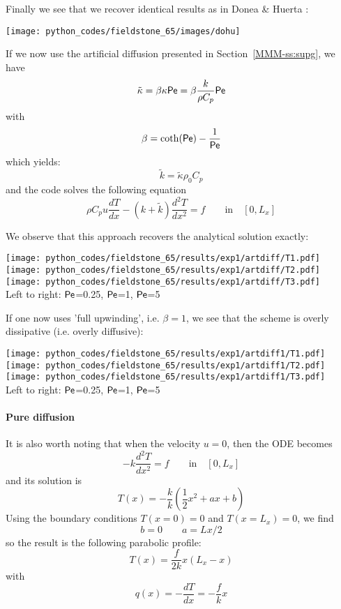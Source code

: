 Finally we see that we recover identical results as in Donea \& Huerta \cite{dohu03}:

\begin{center}
\texttt{[image: python\_codes/fieldstone\_65/images/dohu]}
\end{center}

If we now use the artificial diffusion presented in Section~\ref{MMM-ss:supg}, we have
\[
\tilde{\kappa}=\beta \kappa {\mathsf{Pe}} = \beta \frac{k}{\rho C_p} {\mathsf{Pe}}
\]
with 
\[
\beta=\coth({\mathsf{Pe}})-\frac{1}{{\mathsf{Pe}}}
\]
which yields:
\[
\tilde{k} = \tilde{\kappa} \rho_0 C_p 
\]
and the code solves the following equation
\begin{equation}
\rho C_p u \frac{dT}{dx} - (k + \tilde{k})\frac{d^2T}{dx^2} = f \qquad \text{in} \quad [0,L_x]
\end{equation}


We observe that this approach recovers the analytical solution exactly:
\begin{center}
\texttt{[image: python\_codes/fieldstone\_65/results/exp1/artdiff/T1.pdf]}
\texttt{[image: python\_codes/fieldstone\_65/results/exp1/artdiff/T2.pdf]}
\texttt{[image: python\_codes/fieldstone\_65/results/exp1/artdiff/T3.pdf]}\\
{\captionfont Left to right: ${\mathsf{Pe}}$=0.25, ${\mathsf{Pe}}$=1, ${\mathsf{Pe}}$=5}
\end{center}

If one now uses 'full upwinding', i.e. $\beta=1$, we see that the scheme is 
overly dissipative (i.e. overly diffusive):

\begin{center}
\texttt{[image: python\_codes/fieldstone\_65/results/exp1/artdiff1/T1.pdf]}
\texttt{[image: python\_codes/fieldstone\_65/results/exp1/artdiff1/T2.pdf]}
\texttt{[image: python\_codes/fieldstone\_65/results/exp1/artdiff1/T3.pdf]}\\
{\captionfont Left to right: ${\mathsf{Pe}}$=0.25, ${\mathsf{Pe}}$=1, ${\mathsf{Pe}}$=5}
\end{center}

\paragraph{Pure diffusion} It is also worth noting that when the velocity $u=0$, then the ODE becomes 
\begin{equation}
- k \frac{d^2T}{dx^2} = f \qquad \text{in} \quad [0,L_x]
\end{equation}
and its solution is 
\[
T(x)=-\frac{k}{k} (\frac{1}{2}x^2 + a x + b)
\]
Using the boundary conditions $T(x=0)=0$ and $T(x=L_x)=0$, we find
\[
b=0
\qquad
a = Lx/2
\]
so the result is the following parabolic profile: 
\[
T(x)=\frac{f}{2k}x(L_x-x)
\]
with 
\[
q(x)=-\frac{dT}{dx} = -\frac{f}{k}x
\]


